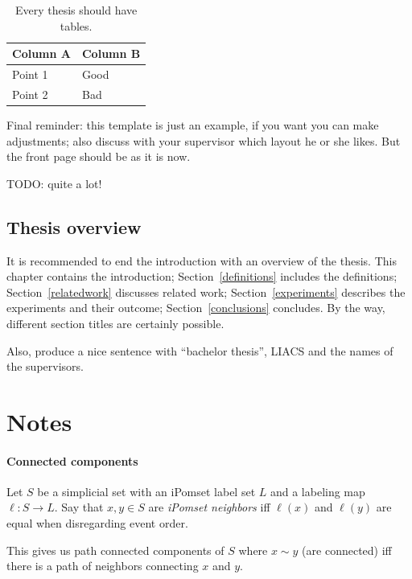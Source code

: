 \documentclass[12pt]{article}
\begin{document}
\begin{table}[!htbp]
\begin{center}
\begin{tabular}{l|l}
Column A & Column B\\
\hline
Point 1 & Good\\
Point 2 & Bad
\end{tabular}
\end{center}
\caption{Every thesis should have tables.}\label{atable}
\end{table}

Final reminder: this template is just an example, if you want you can make adjustments; also discuss with your supervisor which layout he or she likes. But the front page should be as it is now.

TODO: quite a lot!

\subsection{Thesis overview}
It is recommended to end the introduction with an overview of the thesis. This chapter contains the introduction; Section~\ref{definitions} includes the definitions; Section~\ref{relatedwork} discusses related work; Section~\ref{experiments} describes the experiments and their outcome; Section~\ref{conclusions} concludes. By the way, different section titles are certainly possible.

Also, produce a nice sentence with ``bachelor thesis'', LIACS and the names of the supervisors.

\section{Notes}\label{notes}
\paragraph{Connected components}
Let $S$ be a simplicial set with an iPomset label set $L$ and a labeling map $\ell: S \rightarrow L$. Say that $x,y\in S$ are \textit{iPomset neighbors} iff $\ell(x)$ and $\ell(y)$ are equal when disregarding event order.

This gives us path connected components of $S$ where $x\sim y$ (are connected) iff there is a path of neighbors connecting $x$ and $y$.
\end{document}
